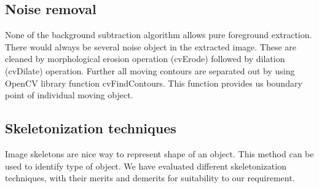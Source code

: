 \subsection{Noise removal}

\indent None of the background subtraction algorithm allows pure
foreground extraction. There would always be several noise object in the
extracted image. These are cleaned by morphological erosion operation
(cvErode) followed by dilation (cvDilate) operation. Further all moving
contours are separated out by using OpenCV library function
cvFindContours. This function provides us boundary point of individual
moving object.

\subsection{Skeletonization techniques}

\indent Image skeletons are nice way to represent shape of an object.
This method can be used to identify type of object. We have evaluated
different skeletonization techniques, with their merits and demerits for
suitability to our requirement.\\

